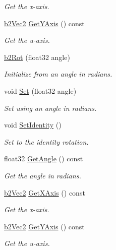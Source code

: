 \begin{DoxyCompactItemize}
\begin{DoxyCompactList}\small\item\em Get the x-\/axis. \end{DoxyCompactList}\item 
\mbox{\label{structb2Rot_ab057c4e9dc821099949391a6ded36dd6}} 
\hyperlink{structb2Vec2}{b2\+Vec2} \hyperlink{structb2Rot_ab057c4e9dc821099949391a6ded36dd6}{Get\+Y\+Axis} () const
\begin{DoxyCompactList}\small\item\em Get the u-\/axis. \end{DoxyCompactList}\item 
\hyperlink{structb2Rot_aa40dda6d390a2f54c793c63027a9b46e}{b2\+Rot} (float32 angle)
\begin{DoxyCompactList}\small\item\em Initialize from an angle in radians. \end{DoxyCompactList}\item 
void \hyperlink{structb2Rot_acde9186de0a4a7397bf8ef714408ad60}{Set} (float32 angle)
\begin{DoxyCompactList}\small\item\em Set using an angle in radians. \end{DoxyCompactList}\item 
\mbox{\label{structb2Rot_a7f534cb7ece8d325662d7d0e27d4f617}} 
void \hyperlink{structb2Rot_a7f534cb7ece8d325662d7d0e27d4f617}{Set\+Identity} ()
\begin{DoxyCompactList}\small\item\em Set to the identity rotation. \end{DoxyCompactList}\item 
\mbox{\label{structb2Rot_a45031fccfa11d3b3a09154008ce28b39}} 
float32 \hyperlink{structb2Rot_a45031fccfa11d3b3a09154008ce28b39}{Get\+Angle} () const
\begin{DoxyCompactList}\small\item\em Get the angle in radians. \end{DoxyCompactList}\item 
\mbox{\label{structb2Rot_a952a5555c1f68ce3e39ac992fcf4eba9}} 
\hyperlink{structb2Vec2}{b2\+Vec2} \hyperlink{structb2Rot_a952a5555c1f68ce3e39ac992fcf4eba9}{Get\+X\+Axis} () const
\begin{DoxyCompactList}\small\item\em Get the x-\/axis. \end{DoxyCompactList}\item 
\mbox{\label{structb2Rot_ab057c4e9dc821099949391a6ded36dd6}} 
\hyperlink{structb2Vec2}{b2\+Vec2} \hyperlink{structb2Rot_ab057c4e9dc821099949391a6ded36dd6}{Get\+Y\+Axis} () const
\begin{DoxyCompactList}\small\item\em Get the u-\/axis. \end{DoxyCompactList}\end{DoxyCompactItemize}
